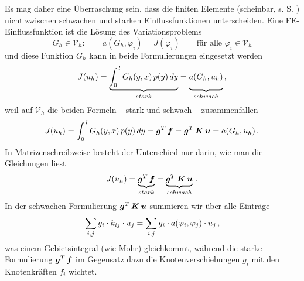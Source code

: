Es mag daher eine \"{U}berraschung sein, dass die finiten Elemente (scheinbar, s. S. \pageref{Eq155}) nicht zwischen schwachen und starken Einflussfunktionen unterscheiden. Eine FE-Einflussfunktion ist die L\"{o}sung des Variationsproblems
\begin{equation}\label{EE7Equationforz}
G_h \in \mathcal{V}_h: \qquad
a(G_h,\varphi_i ) = J(\varphi_i ) \qquad \text{f\"{u}r alle}\,\,\varphi_i  \in \mathcal{V}_h
\end{equation}
und diese Funktion $G_h$ kann in beide Formulierungen eingesetzt werden
\begin{equation}
J(u_h) = \underbrace{\int_0^{\,l} G_h(y,x)\,p(y)\,dy}_{stark} =
\underbrace{\vphantom{\int_0^{\,l} }a(G_h,u_h)}_{schwach}\,,
\end{equation}
weil auf $\mathcal{V}_h$ die beiden Formeln -- stark und schwach -- zusammenfallen
\begin{equation}
J(u_h) = \int_0^{\,l}
G_h(y,x)\,p(y)\,dy = \mbox{\boldmath $g$}^T\,\mbox{\boldmath $f$} = \mbox{\boldmath $g$}^T\,\mbox{\boldmath $K$}\,\mbox{\boldmath $u$} = a(G_h,u_h)\,.
\end{equation}
In Matrizenschreibweise besteht der Unterschied nur darin, wie man die Gleichungen liest
\begin{equation}
J(u_h) = \underbrace{\mbox{\boldmath $g$}^T\,\mbox{\boldmath $f$}}_{stark} = \underbrace{\mbox{\boldmath $g$}^T\,\mbox{\boldmath $K$}\,\mbox{\boldmath $u$}}_{schwach}\,.
\end{equation}
In der schwachen Formulierung $\mbox{\boldmath $g$}^T\,\mbox{\boldmath $K$}\,\mbox{\boldmath $u$}$ summieren wir \"{u}ber alle Eintr\"{a}ge
\begin{align}
\sum_{i,j} g_i\cdot k_{ij}\cdot u_j = \sum_{i,j} g_i \cdot a(\varphi_i,\varphi_j) \cdot u_j\,,
\end{align}
was einem Gebietsintegral (wie \glq Mohr\grq{}) gleichkommt, w\"{a}hrend die starke Formulierung $\mbox{\boldmath $g$}^T\,\mbox{\boldmath $f$}$ im Gegensatz dazu die Knotenverschiebungen $g_i$ mit den Knotenkr\"{a}ften $f_i$ wichtet.

